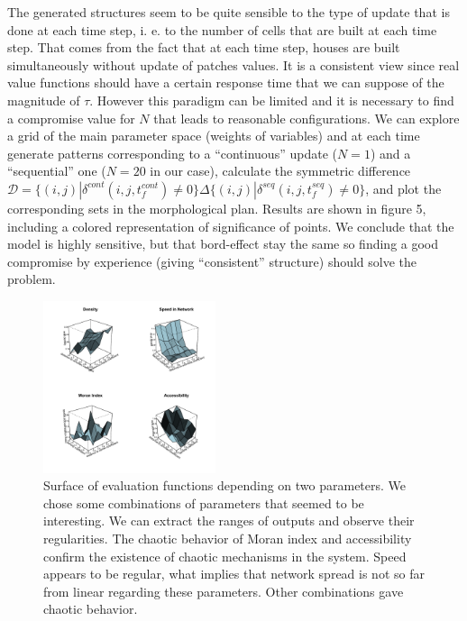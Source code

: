 \documentclass[a4paper,twocolumn,twoside,10pt]{article}
\begin{document}
The generated structures seem to be quite sensible to the type of
update that is done at each time step, i. e. to the number of cells
that are built at each time step. That comes from the fact that at
each time step, houses are built simultaneously without update of
patches values. It is a consistent view since real value functions
should have a certain response time that we can suppose of the magnitude
of $\tau$. However this paradigm can be limited and it is necessary
to find a compromise value for $N$ that leads to reasonable configurations.
We can explore a grid of the main parameter space (weights of variables)
and at each time generate patterns corresponding to a ``continuous''
update ($N=1$) and a ``sequential'' one ($N=20$ in our case),
calculate the symmetric difference $\mathcal{D}=\{(i,j)|\delta^{cont}(i,j,t_{f}^{cont})\neq0\}\Delta\{(i,j)|\delta^{seq}(i,j,t_{f}^{seq})\neq0\}$,
and plot the corresponding sets in the morphological plan. Results
are shown in figure 5, including a colored representation of significance
of points. We conclude that the model is highly sensitive, but that
bord-effect stay the same so finding a good compromise by experience
(giving ``consistent'' structure) should solve the problem.


\begin{figure}[htp]
\centering
\includegraphics[width=0.45\textwidth]{figures/plots3d}
\caption{Surface of evaluation functions depending
on two parameters. We chose some combinations of parameters
that seemed to be interesting. We can extract the ranges of outputs
and observe their regularities. The chaotic behavior of Moran index
and accessibility confirm the existence of chaotic mechanisms in the
system. Speed appears to be regular, what implies that network spread
is not so far from linear regarding these parameters. Other combinations
gave chaotic behavior.}

\label{fig6}

\end{figure}
\end{document}
